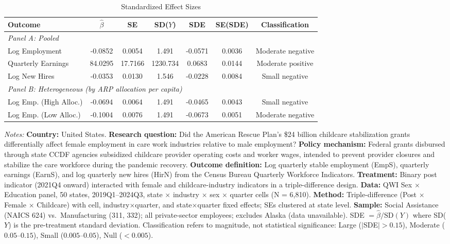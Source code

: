 \begin{table}[htbp]
\centering
\caption{Standardized Effect Sizes}
\label{tab:sde}
\begin{adjustbox}{max width=\textwidth}
\begin{tabular}{lcccccc}
\toprule
Outcome & $\hat{\beta}$ & SE & SD($Y$) & SDE & SE(SDE) & Classification \\
\midrule
\multicolumn{7}{l}{\textit{Panel A: Pooled}} \\[3pt]
Log Employment & -0.0852 & 0.0054 & 1.491 & -0.0571 & 0.0036 & Moderate negative \\
Quarterly Earnings & 84.0295 & 17.7166 & 1230.734 & 0.0683 & 0.0144 & Moderate positive \\
Log New Hires & -0.0353 & 0.0130 & 1.546 & -0.0228 & 0.0084 & Small negative \\
\midrule
\multicolumn{7}{l}{\textit{Panel B: Heterogeneous (by ARP allocation per capita)}} \\[3pt]
Log Emp. (High Alloc.) & -0.0694 & 0.0064 & 1.491 & -0.0465 & 0.0043 & Small negative \\
Log Emp. (Low Alloc.) & -0.1004 & 0.0076 & 1.491 & -0.0673 & 0.0051 & Moderate negative \\
\bottomrule
\end{tabular}
\end{adjustbox}
\begin{tablenotes}[flushleft]
\small
\item \textit{Notes:} \textbf{Country:} United States. \textbf{Research question:} Did the American Rescue Plan's \$24 billion childcare stabilization grants differentially affect female employment in care work industries relative to male employment? \textbf{Policy mechanism:} Federal grants disbursed through state CCDF agencies subsidized childcare provider operating costs and worker wages, intended to prevent provider closures and stabilize the care workforce during the pandemic recovery. \textbf{Outcome definition:} Log quarterly stable employment (EmpS), quarterly earnings (EarnS), and log quarterly new hires (HirN) from the Census Bureau Quarterly Workforce Indicators. \textbf{Treatment:} Binary post indicator (2021Q4 onward) interacted with female and childcare-industry indicators in a triple-difference design. \textbf{Data:} QWI Sex $\times$ Education panel, 50 states, 2019Q1--2024Q3, state $\times$ industry $\times$ sex $\times$ quarter cells (N = 6,810). \textbf{Method:} Triple-difference (Post $\times$ Female $\times$ Childcare) with cell, industry$\times$quarter, and state$\times$quarter fixed effects; SEs clustered at state level. \textbf{Sample:} Social Assistance (NAICS 624) vs.\ Manufacturing (311, 332); all private-sector employees; excludes Alaska (data unavailable). SDE $= \hat{\beta} / \text{SD}(Y)$ where SD($Y$) is the pre-treatment standard deviation. Classification refers to magnitude, not statistical significance: Large ($|$SDE$| > 0.15$), Moderate ($0.05$--$0.15$), Small ($0.005$--$0.05$), Null ($< 0.005$).
\end{tablenotes}
\end{table}
